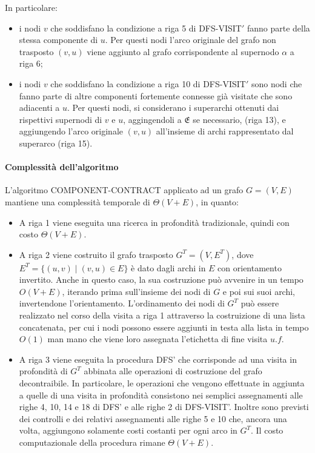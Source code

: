     \newpage
    In particolare:
    \begin{itemize}
        \item i nodi $v$ che soddisfano la condizione a riga 5 di DFS-VISIT$\mathcal{'}$ fanno parte della stessa componente di $u$.
        Per questi nodi l'arco originale del grafo non trasposto $(v, u)$ viene aggiunto al grafo corrispondente al
        supernodo $\alpha$ a riga 6;
        \item i nodi $v$ che soddisfano la condizione a riga 10 di DFS-VISIT$\mathcal{'}$ sono nodi che fanno parte di altre
        componenti fortemente connesse gi\`a visitate che sono adiacenti a $u$.
        Per questi nodi, si considerano i superarchi ottenuti dai rispettivi supernodi di $v$ e $u$, aggingendoli a
	    $\mathfrak{E}$ se necessario, (riga 13), e aggiungendo l'arco originale $(v, u)$ all'insieme di archi
        rappresentato dal superarco (riga 15).
    \end{itemize}

    \paragraph{Complessit\`a dell'algoritmo}
    L'algoritmo COMPONENT-CONTRACT applicato ad un grafo $G = (V, E)$  mantiene una complessit\`a temporale di
    $\Theta(V + E)$, in quanto:
    \begin{itemize}
        \item A riga 1 viene eseguita una ricerca in profondit\`a tradizionale, quindi con costo $\Theta(V + E)$.
        \item A riga 2 viene costruito il grafo trasposto $G^T = (V, E^T)$, dove $E^T = \{(u, v) \mid (v, u) \in E\}$ \`e
        dato dagli archi in $E$ con orientamento invertito.
        Anche in questo caso, la sua costruzione pu\`o avvenire in un tempo $O(V + E)$, iterando prima sull'insieme dei
        nodi di $G$ e poi sui suoi archi, invertendone l'orientamento.
        L'ordinamento dei nodi di $G^T$ pu\`o essere realizzato nel corso della visita a riga 1 attraverso la costruizione
        di una lista concatenata, per cui i nodi possono essere aggiunti in testa alla lista in tempo $O(1)$  man mano
        che viene loro assegnata l'etichetta di fine visita $u.f$.
        \item A riga 3 viene eseguita la procedura DFS' che corrisponde ad una visita in profondit\`a di $G^T$ abbinata
        alle operazioni di costruzione del grafo decontraibile.
        In particolare, le operazioni che vengono effettuate in aggiunta a quelle di una visita in profondit\`a consistono
        nei semplici assegnamenti alle righe 4, 10, 14 e 18 di DFS' e alle righe
        2 di DFS-VISIT'.
        Inoltre sono previsti dei controlli e dei relativi assegnamenti alle righe 5 e 10 che,
        ancora una volta, aggiungono solamente costi costanti per ogni arco in $G^T$.
        Il costo computazionale della procedura rimane $\Theta(V + E)$.
    \end{itemize}

